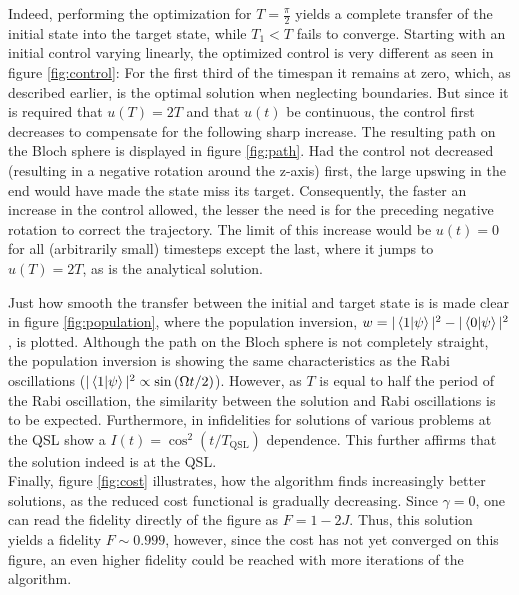 Indeed, performing the optimization for $T = \frac{\pi}{2}$ yields a complete transfer of the initial state into the target state, while $T_1 < T$ fails to converge. Starting with an initial control varying linearly, the optimized control is very different as seen in figure \ref{fig:control}: For the first third of the timespan it remains at zero, which, as described earlier, is the optimal solution when neglecting boundaries. But since it is required that $u(T) = 2 T$ and that $u(t)$ be continuous, the control first decreases to compensate for the following sharp increase.
The resulting path on the Bloch sphere is displayed in figure \ref{fig:path}. Had the control not decreased (resulting in a negative rotation around the z-axis) first, the large upswing in the end would have made the state miss its target. Consequently, the faster an increase in the control allowed, the lesser the need is for the preceding negative rotation to correct the trajectory. The limit of this increase would be $u(t)=0$ for all (arbitrarily small) timesteps except the last, where it jumps to $u(T)=2T$, as is the analytical solution.

Just how smooth the transfer between the initial and target state is is made clear in figure \ref{fig:population}, where the population inversion, $w = |\braket{1|\psi}|^2 - |\braket{0|\psi}|^2$, is plotted. Although the path on the Bloch sphere is not completely straight, the population inversion is showing the same characteristics as the Rabi oscillations ($|\braket{1|\psi}|^2 \propto \sin \left( \Omega t / 2 \right)$). However, as $T$ is equal to half the period of the Rabi oscillation, the similarity between the solution and Rabi oscillations is to be expected. Furthermore, in \cite{Caneva2011} infidelities for solutions of various problems at the QSL show a $I(t)= \cos^2\left(t/T_{\mathrm{QSL}}\right)$ dependence. This further affirms that the solution indeed is at the QSL.\\
Finally, figure \ref{fig:cost} illustrates, how the algorithm finds increasingly better solutions, as the reduced cost functional is gradually decreasing. Since $\gamma = 0$, one can read the fidelity directly of the figure as $F = 1 - 2 J$. Thus, this solution yields a fidelity $F \sim 0.999$, however, since the cost has not yet converged on this figure, an even higher fidelity could be reached with more iterations of the algorithm. 


